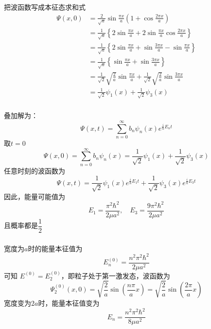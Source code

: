 \begin{frame}
  \frametitle{}
把波函数写成本征态求和式
$$
\begin{aligned}
\Psi(x,0) &= \frac{2}{\sqrt{a}} \sin \frac{\pi x}{a}\left(1+\cos \frac{2 \pi x}{a}\right) \\
&=\frac{1}{\sqrt{a}}\left\{2 \sin \frac{\pi x}{a}+2 \sin \frac{\pi x}{a} \cos \frac{2 \pi x}{a}\right\}  \\
&=\frac{1}{\sqrt{a}}\left\{2 \sin \frac{\pi x}{a}+\sin \frac{3 \pi x}{a}-\sin \frac{\pi x}{a}\right\} \\
&=\frac{1}{\sqrt{a}}\left\{\sin \frac{\pi x}{a}+\sin \frac{3 \pi x}{a}\right\} \\
&= \frac{1}{\sqrt{2}} \sqrt{\frac{2}{a}} \sin \frac{\pi x}{a}+\frac{1}{\sqrt{2}} \sqrt{\frac{2}{a}} \sin \frac{3 \pi x}{a} \\
&=\frac{1}{\sqrt{2}} \psi_1(x)+\frac{1}{\sqrt{2}} \psi_3(x) 
\end{aligned}
$$
\end{frame} 

\begin{frame}
  \frametitle{}
叠加解为：
\[\Psi(x,t)= \sum_{n=0} ^{\infty}  b_n \psi_n(x) e^{\frac{i}{\hbar}E_n t}\]
取$t=0$
$$
\Psi(x,0)= \sum_{n=0} ^{\infty}  b_n \psi_n(x) = \frac{1}{\sqrt{2}} \psi_1(x)+\frac{1}{\sqrt{2}} \psi_3(x) 
$$
任意时刻的波函数为
\[\Psi(x,t)= \frac{1}{\sqrt{2}} \psi_1(x) e^{\frac{i}{\hbar}E_1 t}+\frac{1}{\sqrt{2}} \psi_3(x) e^{\frac{i}{\hbar}E_3 t} \]
因此，能量可能值为
\[ E_1 = \dfrac{\pi^2\hbar^2}{2\mu a^2} ,  \quad E_3= \dfrac{9\pi^2\hbar^2}{2\mu a^2}\]
且概率都是$ \dfrac{1}{2}  $ 
\end{frame} 

\begin{frame}
    \frametitle{}
    \解 宽度为$a$时的能量本征值为
    $$ E^{(0)}_n= \dfrac{n^2\pi^2\hbar^2}{2\mu a^2}$$
    可知 $ E^{(0)}= E^{(0)}_2 $，即粒子处于第一激发态，波函数为
    $$
    \Psi^{(0)}_2(x,0)=\sqrt{\dfrac{2}{a}}\sin(\dfrac{n\pi}{a}x) =\sqrt{\dfrac{2}{a}}\sin(\dfrac{2\pi}{a}x)
    $$
  宽度变为$2a$时，能量本征值变为
  $$ E_n= \dfrac{n^2\pi^2\hbar^2}{8\mu a^2}$$
  \end{frame} 
  
